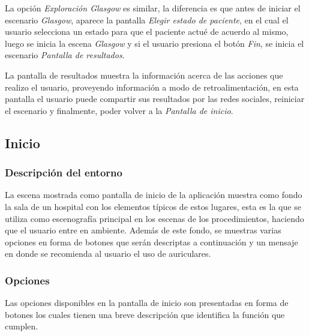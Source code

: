 La opción \emph{Exploración Glasgow} es similar, la diferencia es que antes de
iniciar el escenario \emph{Glasgow}, aparece la pantalla \emph{Elegir estado de
    paciente}, en el cual el usuario selecciona un estado para que el paciente
actué de acuerdo al mismo, luego se inicia la escena \emph{Glasgow} y si el
usuario presiona el botón \emph{Fin}, se inicia el escenario \emph{Pantalla de
    resultados}.

La pantalla de resultados muestra la información acerca de las acciones que
realizo el usuario, proveyendo información a modo de retroalimentación, en esta
pantalla el usuario puede compartir sus resultados por las redes sociales,
reiniciar el escenario y finalmente, poder volver a la \emph{Pantalla de
    inicio}.


\subsection{Inicio}

\subsubsection{Descripción del entorno}

La escena mostrada como pantalla de inicio de la aplicación muestra como fondo la sala de 
un hospital con los elementos típicos de estos lugares, esta es la que se utiliza como 
escenografía principal en los escenas de los procedimientos, haciendo que el usuario entre 
en ambiente. Además de este fondo, se muestras varias opciones en forma de botones que serán 
descriptas a continuación y un mensaje en donde se recomienda al usuario el uso de auriculares.

\subsubsection{Opciones}

Las opciones disponibles en la pantalla de inicio son presentadas en forma de
botones los cuales tienen una breve descripción que identifica la función que
cumplen. 



